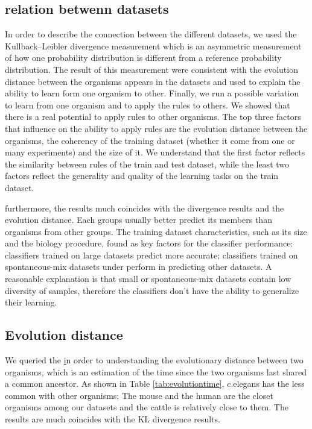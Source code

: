 \documentclass{bmcart}
\begin{document}
\subsection{relation betwenn datasets}
In order to describe the connection between the different datasets, we used the Kullback–Leibler divergence measurement which is an asymmetric measurement of how one probability distribution is different from a reference probability distribution. The result of this measurement were consistent with the evolution distance between the organisms appears in the datasets and used to explain the ability to learn form one organism to other.
Finally, we run a possible variation to learn from one organism and to apply the rules to others. We showed that there is a real potential to apply rules to other organisms. The top three factors that influence on the ability to apply rules are the evolution distance between the organisms, the coherency of the training dataset (whether it come from one or many experiments) and the size of it. We understand that the first factor reflects the similarity between rules of the train and test dataset, while the least two factors reflect the generality and quality of the learning tasks on the train dataset.


furthermore, the results much coincides with the divergence results and the evolution distance. Each groups usually better predict its members than organisms from other groups. The training dataset characteristics, such as its size and the biology procedure, found as key factors for the classifier performance: classifiers trained on large datasets predict more accurate;  classifiers trained on spontaneous-mix datasets under perform in predicting other datasets. A reasonable explanation is that small or spontaneous-mix datasets contain low diversity of samples, therefore the classifiers don't have the ability to generalize their learning.




\subsection*{Evolution distance}
We queried the \href{http://www.timetree.org} in order to understanding the evolutionary distance between two organisms, which is an estimation of the time since the two organisms last shared a common ancestor. As shown in Table \ref{tab:evolutiontime}, c.elegans has the less common with other organisms; The mouse and the human are the closet organisms among our datasets and the cattle is relatively close to them. The results are much coincides with the KL divergence results.
\end{document}
